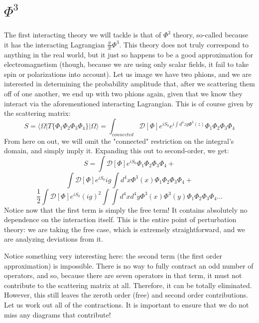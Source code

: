 \documentclass{report}
\begin{document}
\section{$\Phi^3$}
The first interacting theory we will tackle is that of $\Phi^3$ theory, so-called because it has the interacting Lagrangian $\frac{g}{3!}\Phi^3$. This theory does not truly correspond to anything in the real world, but it just so happens to be a good approximation for electromagnetism (though, because we are using only scalar fields, it fail to take spin or polarizations into account). Let us image we have two phions, and we are interested in determining the probability amplitude that, after we scattering them off of one another, we end up with two phions again, given that we know they interact via the aforementioned interacting Lagrangian. This is of course given by the scattering matrix:
\[
S = \langle \Omega \vert T\{ \Phi_1 \Phi_2 \Phi_3 \Phi_4 \} \vert \Omega \rangle = \int_{connected} \mathcal{D}[\Phi]e^{iS_0}e^{i\int d^4z g\Phi^3(z)} \Phi_1 \Phi_2 \Phi_3 \Phi_4
\]
From here on out, we will omit the "connected" restriction on the integral's domain, and simply imply it. Expanding this out to second-order, we get:
\[
S = \int \mathcal{D}[\Phi]e^{iS_0} \Phi_1 \Phi_2 \Phi_3 \Phi_4 + \]\[
\int \mathcal{D}[\Phi]e^{iS_0}ig\int d^4x \Phi^3(x) \Phi_1 \Phi_2 \Phi_3 \Phi_4 + \]\[
\frac{1}{2}\int \mathcal{D}[\Phi]e^{iS_0}(ig)^2\int \int d^4x d^4y \Phi^3(x) \Phi^3(y) \Phi_1 \Phi_2 \Phi_3 \Phi_4 ...
\]
Notice now that the first term is simply the free term! It contains absolutely no dependence on the interaction itself. This is the entire point of perturbation theory: we are taking the free case, which is extremely straightforward, and we are analyzing deviations from it.

Notice something very interesting here: the second term (the first order approximation) is impossible. There is no way to fully contract an odd number of operators, and so, because there are seven operators in that term, it must not contribute to the scattering matrix at all. Therefore, it can be totally eliminated. However, this still leaves the zeroth order (free) and second order contributions. Let us work out all of the contractions. It is important to ensure that we do not miss any diagrams that contribute!
\end{document}
